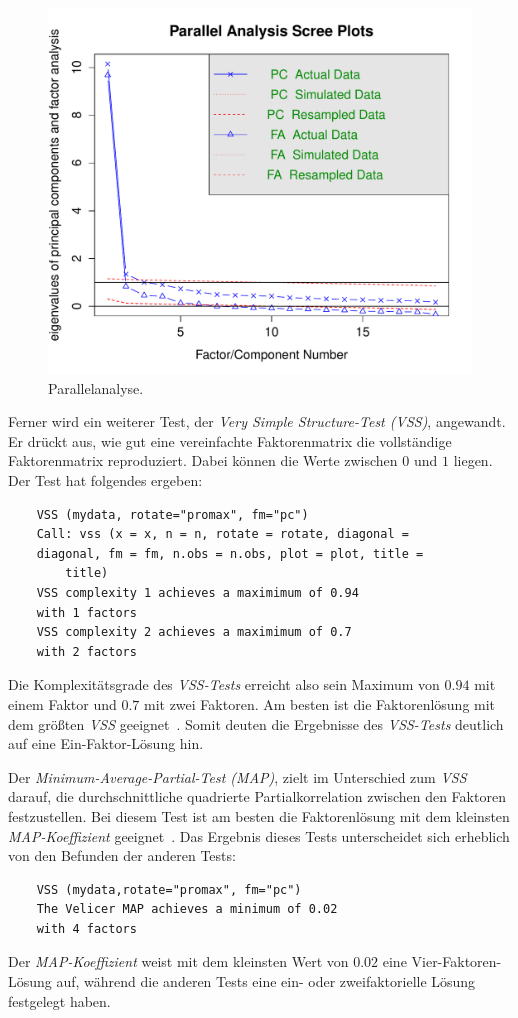 \documentclass[12pt,a4paper]{article}
\begin{document}
\begin{figure}[h]
\centering
\includegraphics[scale=0.75]{../R-Berechnungen/Rplot02.pdf}
\caption{Parallelanalyse.}
\label{fig_para}
\end{figure}

Ferner wird ein weiterer Test, der \textit{Very Simple Structure-Test (VSS)}, angewandt. Er drückt aus, wie gut eine vereinfachte Faktorenmatrix die vollständige Faktorenmatrix reproduziert. Dabei können die Werte zwischen $0$ und $1$ liegen. Der Test hat folgendes ergeben:
\begin{verbatim}
	VSS (mydata, rotate="promax", fm="pc")
	Call: vss (x = x, n = n, rotate = rotate, diagonal = 
	diagonal, fm = fm, n.obs = n.obs, plot = plot, title = 
		title)
	VSS complexity 1 achieves a maximimum of 0.94 
	with 1 factors
	VSS complexity 2 achieves a maximimum of 0.7 
	with 2 factors
	\end{verbatim}
\noindent Die Komplexitätsgrade des \textit{VSS-Tests} erreicht also sein Maximum von $0.94$ mit einem Faktor und $0.7$ mit zwei Faktoren. Am besten ist die Faktorenlösung mit dem größten \textit{VSS} geeignet~\cite[S.~274]{Quellenangaben}. Somit deuten die Ergebnisse des \textit{VSS-Tests} deutlich auf eine Ein-Faktor-Lösung hin.

	Der \textit{Minimum-Average-Partial-Test (MAP)}, zielt im Unterschied zum \textit{VSS} darauf, die durchschnittliche quadrierte Partialkorrelation zwischen den Faktoren festzustellen.  Bei diesem Test ist am besten die Faktorenlösung mit dem kleinsten \textit{MAP-Koeffizient} geeignet~\cite[S.~274]{Quellenangaben}. Das Ergebnis dieses Tests unterscheidet sich erheblich von den Befunden der anderen Tests:
	\begin{verbatim}
	VSS (mydata,rotate="promax", fm="pc")
	The Velicer MAP achieves a minimum of 0.02 
	with 4 factors
	\end{verbatim}
\noindent Der \textit{MAP-Koeffizient} weist mit dem kleinsten Wert von $0.02$ eine Vier-Faktoren-Lösung auf, während die anderen Tests eine ein- oder zweifaktorielle Lösung festgelegt haben.
\end{document}
